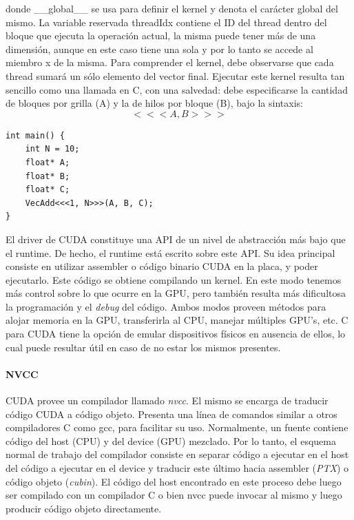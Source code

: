 donde \_\_global\_\_ se usa para definir el kernel y denota el car\'acter global del mismo.
La variable reservada threadIdx contiene el ID del thread dentro del bloque que ejecuta la operaci\'on actual, la misma puede tener m\'as de una dimensi\'on, aunque en este caso tiene una sola y por lo tanto se accede al miembro x de la misma.
Para comprender el kernel, debe observarse que cada thread sumar\'a un s\'olo elemento del vector final.
Ejecutar este kernel resulta tan sencillo como una llamada en C, con una salvedad: debe especificarse la cantidad de bloques por grilla (A) y la de hilos por bloque (B), bajo la sintaxis:
$$<<<A , B >>>$$

\begin{verbatim}
int main() {
    int N = 10;
    float* A;
    float* B;
    float* C;
    VecAdd<<<1, N>>>(A, B, C);
}

\end{verbatim}


El driver de CUDA constituye una API de un nivel de abstracci\'on m\'as bajo que el runtime.
De hecho, el runtime est\'a escrito sobre este API.
Su idea principal consiste en utilizar assembler o c\'odigo binario CUDA en la placa, y poder ejecutarlo.
Este c\'odigo se obtiene compilando un kernel.
En este modo tenemos m\'as control sobre lo que ocurre en la GPU, pero tambi\'en resulta m\'as dificultosa la programaci\'on y el {\em debug} del c\'odigo.
Ambos modos proveen m\'etodos para alojar memoria en la GPU, transferirla al CPU, manejar m\'ultiples GPU's, etc.
C para CUDA tiene la opci\'on de emular dispositivos f\'isicos en ausencia de ellos, lo cual puede resultar \'util en caso de no estar los mismos presentes.

\paragraph{NVCC}
CUDA provee un compilador llamado {\em nvcc}.
El mismo se encarga de traducir c\'odigo CUDA a c\'odigo objeto.
Presenta una l\'inea de comandos similar a otros compiladores C como gcc, para facilitar su uso.
Normalmente, un fuente contiene c\'odigo del host (CPU) y del device (GPU) mezclado.
Por lo tanto, el esquema normal de trabajo del compilador consiste en separar c\'odigo a ejecutar en el host del c\'odigo a ejecutar en el device y traducir este \'ultimo hacia assembler ({\em PTX}) o c\'odigo objeto ({\em cubin}).
El c\'odigo del host encontrado en este proceso debe luego ser compilado con un compilador C o bien nvcc puede invocar al mismo y luego producir c\'odigo objeto directamente.

